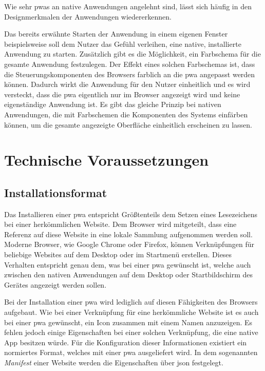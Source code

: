 \documentclass[12pt, parskip=half]{scrartcl}       %
\begin{document}
Wie sehr \acp{pwa} an native Anwendungen angelehnt sind, lässt sich häufig in den Designmerkmalen der Anwendungen wiedererkennen.

Das bereits erwähnte Starten der Anwendung in einem eigenen Fenster beispielsweise soll dem Nutzer das Gefühl verleihen, eine native, installierte Anwendung zu starten.
Zusätzlich gibt es die Möglichkeit, ein Farbschema für die gesamte Anwendung festzulegen.
Der Effekt eines solchen Farbschemas ist, dass die Steuerungskomponenten des Browsers farblich an die \ac{pwa} angepasst werden können.
Dadurch wirkt die Anwendung für den Nutzer einheitlich und es wird versteckt, dass die \ac{pwa} eigentlich nur im Browser angezeigt wird und keine eigenständige Anwendung ist.
Es gibt das gleiche Prinzip bei nativen Anwendungen, die mit Farbschemen die Komponenten des Systems einfärben können, um die gesamte angezeigte Oberfläche einheitlich erscheinen zu lassen.




\section{Technische Voraussetzungen}


\subsection{Installationsformat}

Das Installieren einer \ac{pwa} entspricht Größtenteils dem Setzen eines Lesezeichens bei einer herkömmlichen Website.
Dem Browser wird mitgeteilt, dass eine Referenz auf diese Website in eine lokale Sammlung aufgenommen werden soll.
Moderne Browser, wie Google Chrome oder Firefox, können Verknüpfungen für beliebige Websites auf dem Desktop oder im Startmenü erstellen.\cite{mozillasupport_desktopshortcut}\cite{businessinsider_desktopshortcut_chrome}
Dieses Verhalten entspricht genau dem, was bei einer \ac{pwa} gewünscht ist, welche auch zwischen den nativen Anwendungen auf dem Desktop oder Startbildschirm des Gerätes angezeigt werden sollen.

Bei der Installation einer \ac{pwa} wird lediglich auf diesen Fähigkeiten des Browsers aufgebaut.
Wie bei einer Verknüpfung für eine herkömmliche Website ist es auch bei einer \ac{pwa} gewünscht, ein Icon zusammen mit einem Namen anzuzeigen.
Es fehlen jedoch einige Eigenschaften bei einer solchen Verknüpfung, die eine native App besitzen würde.
Für die Konfiguration dieser Informationen existiert ein normiertes Format, welches mit einer \ac{pwa} ausgeliefert wird.
In dem sogenannten \textit{Manifest} einer Website werden die Eigenschaften über \ac{json} festgelegt.
\end{document}
